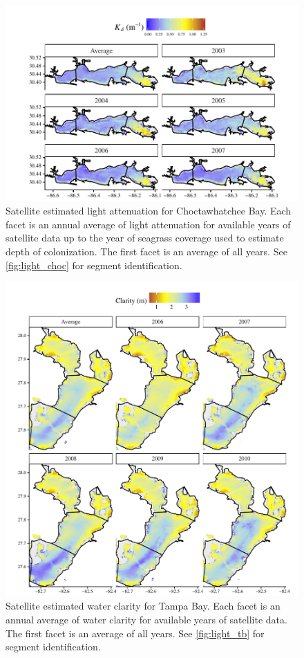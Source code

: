\documentclass[letterpaper,12pt,oneside]{article}\usepackage[]{graphicx}\usepackage[]{color}
\begin{document}
\begin{figure}
\centering
\includegraphics[width = \textwidth]{figs/kd_choc.pdf}
\caption{Satellite estimated light attenuation for Choctawhatchee Bay.  Each facet is an annual average of light attenuation for available years of satellite data up to the year of seagrass coverage used to estimate depth of colonization.  The first facet is an average of all years.  See \cref{fig:light_choc} for segment identification.}
\label{fig:kd_choc}
\end{figure}


\begin{figure}
\centering
\includegraphics[width = \textwidth]{figs/clarity_tb.pdf}
\caption{Satellite estimated water clarity for Tampa Bay.  Each facet is an annual average of water clarity for available years of satellite data. The first facet is an average of all years.  See \cref{fig:light_tb} for segment identification.}
\label{fig:clarity_tb}
\end{figure}
\end{document}
